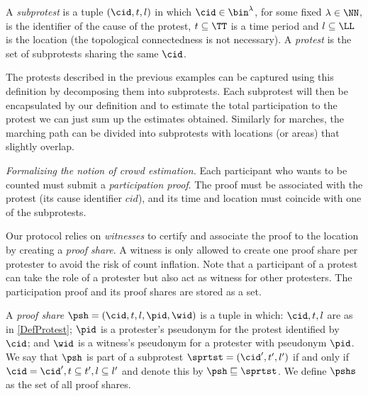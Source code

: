 \begin{definition}\label{DefProtest}
  A \emph{subprotest} is a tuple \((\cid, t, l)\) in which \(\cid\in 
    \bin^{\lambda}\), for some fixed \(\lambda\in \NN\), is the identifier of 
  the cause of the protest,
  \(t \subseteq \TT\) is a time period and \(l \subseteq \LL\) is the location 
  (the topological connectedness is not necessary).
  A \emph{protest} is the set of subprotests sharing the same \(\cid\).
\end{definition}

The protests described in the previous examples can be captured using this definition by decomposing them into subprotests.
Each subprotest will then be encapsulated by our definition and to estimate the total participation to the protest we can just sum up the estimates obtained.
Similarly for marches, the marching path can be divided into subprotests with locations (or areas) that slightly overlap.

\emph{Formalizing the notion of crowd estimation.} 
Each participant who wants to be counted must submit a \emph{participation proof}.
The proof must be associated with the protest (\ie its cause identifier \(cid\)), and its time and location must coincide with one of the subprotests.

Our protocol relies on \emph{witnesses} to certify and associate the proof to the location by creating a \emph{proof share}.
A witness is only allowed to create one proof share per protester to avoid the risk of count inflation.
Note that a participant of a protest can take the role of a protester but also act as witness for other protesters.
The participation proof and its proof shares are stored as a set.


\begin{definition}%
  \label{DefProofShare}\label{DefProofShares}
  A \emph{proof share} \(\psh = (\cid, t, l, \pid, \wid)\) is a tuple in which: 
  \(\cid, t, l\) are as in \cref{DefProtest};
  \(\pid\) is a protester's pseudonym for the protest identified by \(\cid\); and \(\wid\) is a witness's pseudonym for a protester with pseudonym \(\pid\).
  We say that \(\psh\) is part of a subprotest \(\sprtst = (\cid', t', l')\) if and only if \(\cid = \cid', t\subseteq t', l\subseteq l'\) and denote this by 
  \(\psh \sqsubseteq \sprtst\).
  We define \(\pshs\) as the set of all proof shares.
\end{definition}


